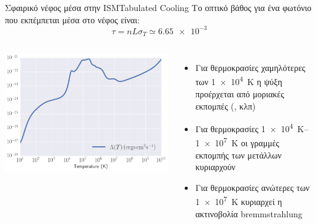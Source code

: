 \documentclass{beamer}
\begin{document}
\begin{frame}{Σφαιρικό νέφος μέσα στην ISM}{Tabulated Cooling}
		Το οπτικό βάθος για ένα φωτόνιο που εκπέμπεται μέσα στο νέφος είναι:
	\begin{equation}
	\tau = nL\sigma _T\simeq \num{6.65e-3}
	\end{equation}
	
\begin{columns}
	\begin{center}
		\includegraphics[width=1\linewidth]{../Document/Images/LambdaT}
	\end{center}
	\begin{itemize}
		\item{Για θερμοκρασίες χαμηλότερες των \SI{1e4}{K} η ψύξη προέρχεται από μοριακές εκπομπές (, κλπ)}
		\item{Για θερμοκρασίες \SIrange{1e4}{1e7}{K} οι γραμμές εκπομπής των μετάλλων κυριαρχούν}
		\item{Για θερμοκρασίες ανώτερες των \SI{1e7}{K} κυριαρχεί η ακτινοβολία bremmstrahlung}
	\end{itemize}
\end{columns}
\end{frame}
\end{document}

